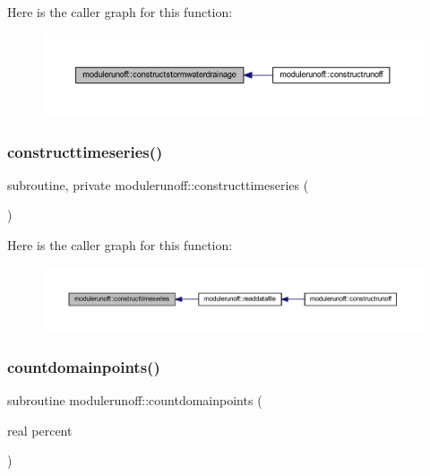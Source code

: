 Here is the caller graph for this function\+:\nopagebreak
\begin{figure}[H]
\begin{center}
\leavevmode
\includegraphics[width=350pt]{namespacemodulerunoff_a03335615cccffdf4fcbc7979c2e2b299_icgraph}
\end{center}
\end{figure}
\mbox{\label{namespacemodulerunoff_a38585735a1deed54aec387488350fd0d}} 
\subsubsection{\texorpdfstring{constructtimeseries()}{constructtimeseries()}}
{\footnotesize\ttfamily subroutine, private modulerunoff\+::constructtimeseries (\begin{DoxyParamCaption}{ }\end{DoxyParamCaption})\hspace{0.3cm}{\ttfamily [private]}}

Here is the caller graph for this function\+:\nopagebreak
\begin{figure}[H]
\begin{center}
\leavevmode
\includegraphics[width=350pt]{namespacemodulerunoff_a38585735a1deed54aec387488350fd0d_icgraph}
\end{center}
\end{figure}
\mbox{\label{namespacemodulerunoff_a6dee0b7b0f34390926e9ca24de451565}} 
\subsubsection{\texorpdfstring{countdomainpoints()}{countdomainpoints()}}
{\footnotesize\ttfamily subroutine modulerunoff\+::countdomainpoints (\begin{DoxyParamCaption}\item[{real}]{percent }\end{DoxyParamCaption})\hspace{0.3cm}{\ttfamily [private]}}

